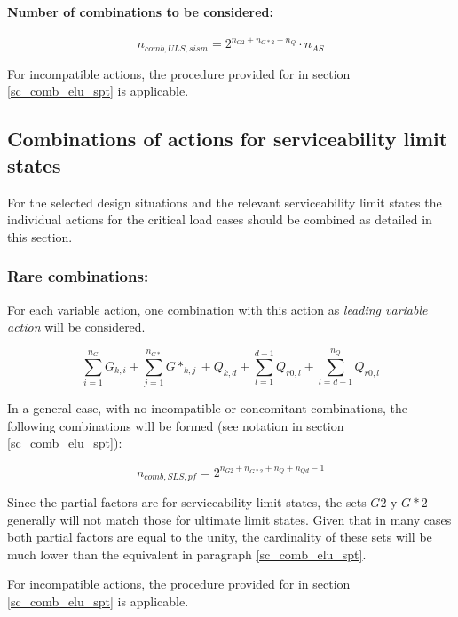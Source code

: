 \paragraph{Number of combinations to be considered:} 

\begin{equation} \label{eq_ncomb_sism}
n_{comb,ULS,sism}= 2^{n_{G2}+n_{G*2}+n_{Q}} \cdot n_{AS}
\end{equation}

For incompatible actions, the procedure provided for in section \ref{sc_comb_elu_spt} is applicable.

\subsection{Combinations of actions for serviceability limit states} \label{sc_comb_els}
For the selected design situations and the relevant serviceability limit states the individual actions for the critical load cases should be combined as detailed in this section.


\subsubsection{Rare combinations:}\label{sc_comb_els_pf}
For each variable action, one combination with this action as \emph{leading variable action} will be considered.

\begin{equation}
\sum_{i=1}^{n_G} G_{k,i} + \sum_{j=1}^{n_{G*}} G*_{k,j} + Q_{k,d} + \sum_{l=1}^{d-1} Q_{r0,l} + \sum_{l=d+1}^{n_Q} Q_{r0,l} 
\end{equation}

In a general case, with no incompatible or concomitant combinations, the following combinations will be formed (see notation in section \ref{sc_comb_elu_spt}):

\begin{equation} \label{eq_ncomb_els_pf}
n_{comb,SLS,pf}= 2^{n_{G2}+n_{G*2}+n_{Q}+n_{Qd}-1}
\end{equation}

Since the partial factors are for serviceability limit states, the sets $G2$ y $G*2$ generally will not match those for ultimate limit states. Given that in many cases both partial factors are equal to the unity, the cardinality of these sets will be much lower than the equivalent in paragraph \ref{sc_comb_elu_spt}.


For incompatible actions, the procedure provided for in section \ref{sc_comb_elu_spt} is applicable.

